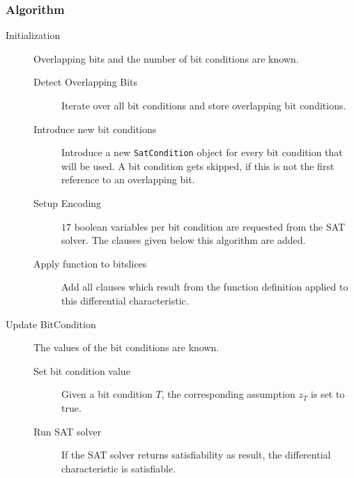 \subsubsection{Algorithm}
\label{sec:exhaustive-algorithm}
%
\begin{description}
  \item[Initialization] Overlapping bits and the number of bit conditions are known.
    \begin{description}
      \item[Detect Overlapping Bits] Iterate over all bit conditions and store overlapping bit conditions.
      \item[Introduce new bit conditions] Introduce a new \texttt{SatCondition} object for every bit condition that will be used. A bit condition gets skipped, if this is not the first reference to an overlapping bit.
      \item[Setup Encoding] $17$ boolean variables per bit condition are requested from the SAT solver. The clauses given below this algorithm are added.
      \item[Apply function to bitslices] Add all clauses which result from the function definition applied to this differential characteristic.
    \end{description}
  \item[Update BitCondition] The values of the bit conditions are known.
    \begin{description}
      \item[Set bit condition value] Given a bit condition $T$, the corresponding assumption $z_T$ is set to true.
      \item[Run SAT solver] If the SAT solver returns satisfiability as result, the differential characteristic is satisfiable.
    \end{description}
\end{description}

